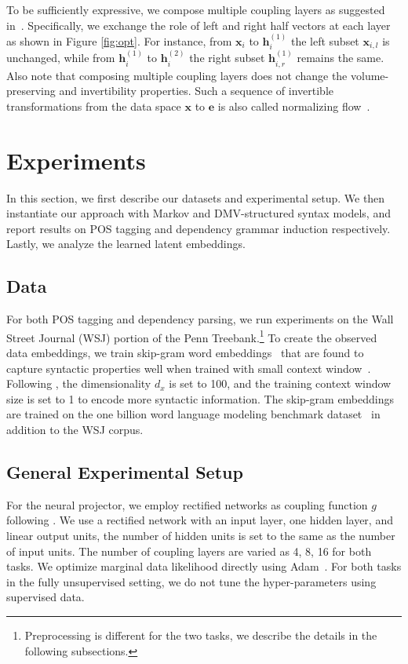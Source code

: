 \documentclass[11pt,a4paper]{article}
\begin{document}
To be sufficiently expressive, we compose multiple coupling layers as suggested in~\citet{dinh2014nice}. Specifically, we exchange the role of left and right half vectors at each layer as shown in Figure \ref{fig:opt}. For instance, from $\bm{x}_i$ to $\bm{h}_i^{(1)}$ the left subset $\bm{x}_{i, l}$ is unchanged, while from $\bm{h}_i^{(1)}$ to $\bm{h}_i^{(2)}$ the right subset $\bm{h}_{i, r}^{(1)}$ remains the same. Also note that composing multiple coupling layers does not change the volume-preserving and invertibility properties. Such a sequence of invertible transformations from the data space $\bm{x}$ to $\bm{e}$ is also called normalizing flow~\citep{rezende2015variational}.





\section{Experiments}
In this section, we first describe our datasets and experimental setup. We then instantiate our approach with Markov and DMV-structured syntax models, and report results on POS tagging and dependency grammar induction respectively. Lastly, we analyze the learned latent embeddings. 

\subsection{Data}
For both POS tagging and dependency parsing, we run experiments on the Wall Street Journal (WSJ) portion of the Penn Treebank.\footnote{Preprocessing is different for the two tasks, we describe the details in the following subsections.} To create the observed data embeddings, we train skip-gram word embeddings~\citep{mikolov2013efficient} that are found to capture syntactic properties well when trained with small context window~\citep{bansal2014tailoring, lin2015unsupervised}. Following \citet{lin2015unsupervised}, the dimensionality $d_x $ is set to 100, and the training context window size is set to 1 to encode more syntactic information. The skip-gram embeddings are trained on the one billion word language modeling benchmark dataset~\citep{chelba2013one} in addition to the WSJ corpus.

\subsection{General Experimental Setup}
For the neural projector, we employ rectified networks as coupling function $g$ following \citet{dinh2014nice}. We use a rectified network with an input layer, one hidden layer, and linear output units, the number of hidden units is set to the same as the number of input units. The number of coupling layers are varied as 4, 8, 16 for both tasks. We optimize marginal data likelihood directly using Adam~\citep{kingma2014adam}. For both tasks in the fully unsupervised setting, we do not tune the hyper-parameters using supervised data.
\end{document}
